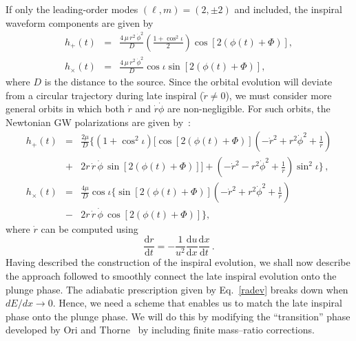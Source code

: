\noindent If only the leading-order modes \((\ell,m)=(2, \pm 2)\) and included, the inspiral waveform components  are given by 
\begin{eqnarray}
h_{+}(t)&=& \frac{4\, \mu\,  r^2\, \dot{\phi}^2 }{D}\left(\frac{1+\cos^2 \iota}{2}\right)\cos\left[2(\phi(t) + \Phi)\right],\label{inspp}\\
h_{\times}(t)&=& \frac{4\, \mu\, r^2\, \dot{\phi}^2}{D} \cos\iota \sin\left[2(\phi(t) + \Phi)\right],
\label{inspc}
\end{eqnarray}
\noindent where \(D\) is the distance to the source. Since the orbital evolution will deviate from a circular trajectory during late inspiral (\(\dot{r}\neq0\)), we must consider more general orbits in which both \(\dot{r}\) and \(\dot{r}\dot{\phi}\) are non-negligible. For such orbits, the Newtonian GW polarizations are given by~\cite{Gopakumar:2002}:
\begin{eqnarray}
\label{insppcor}
h_{+}(t)&=& \frac{2 \mu }{D}\Bigg\{ \left(1+\cos^2 \iota\right) \Bigg[ \cos\left[2(\phi(t) + \Phi)\right]\left(-\dot{r}^2 + r^2 \dot{\phi}^2 + \frac{1}{r}\right) \nonumber \\ &+& 2r\,\dot{r}\,\dot{\phi}\,\sin\left[2(\phi(t) + \Phi)\right]\Bigg] + \left(-\dot{r}^2 - r^2\dot{\phi}^2 + \frac{1}{r}\right)\sin^2 \iota\Bigg\}\,,\\
\label{inspccorrected}
h_{\times}(t)&=&\frac{4 \mu }{D}\cos\iota\Bigg\{  \sin\left[2(\phi(t) + \Phi)\right]\left(-\dot{r}^2 + r^2 \dot{\phi}^2 + \frac{1}{r}\right) \nonumber \\ &-& 2r\,\dot{r}\,\dot{\phi}\,\cos\left[2(\phi(t) + \Phi)\right]\Bigg\},
\end{eqnarray}
\noindent where \(\dot{r}\) can be computed using
\begin{displaymath}
\frac{{\mathrm{d}}r}{{\mathrm{d}}t} = -\frac{1}{u^2}\frac{{\mathrm{d}u}}{{\mathrm{d}}x}\frac{{\mathrm{d}x}}{{\mathrm{d}}t}\, .
\end{displaymath}
Having described the construction of the inspiral evolution, we shall now describe the approach followed to smoothly connect the late inspiral evolution onto the plunge phase. The adiabatic prescription given by Eq.~\eqref{radev} breaks down when \(dE/dx\rightarrow 0\). Hence, we need a scheme that enables us to match the late inspiral phase onto the plunge phase. We will do this by modifying the ``transition'' phase developed by Ori and Thorne~\cite{amos} by including finite mass--ratio corrections. 

